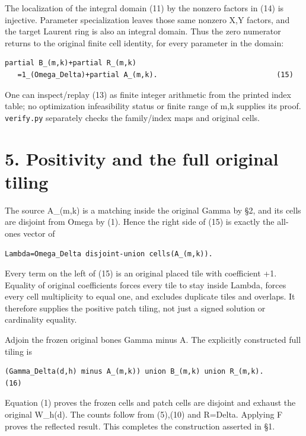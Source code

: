 \documentclass[
  10pt,
]{scrreprt}
\begin{document}
The localization of the integral domain (11) by the nonzero factors in
(14) is injective. Parameter specialization leaves those same nonzero
X,Y factors, and the target Laurent ring is also an integral domain.
Thus the zero numerator returns to the original finite cell identity,
for every parameter in the domain:

\begin{verbatim}
partial B_(m,k)+partial R_(m,k)
   =1_(Omega_Delta)+partial A_(m,k).                            (15)
\end{verbatim}

One can inspect/replay (13) as finite integer arithmetic from the
printed index table; no optimization infeasibility status or finite
range of m,k supplies its proof. \texttt{verify.py} separately checks
the family/index maps and original cells.

\section{5. Positivity and the full original
tiling}\label{edition-11-section-9}

The source A\_(m,k) is a matching inside the original Gamma by §2, and
its cells are disjoint from Omega by (1). Hence the right side of (15)
is exactly the all-ones vector of

\begin{verbatim}
Lambda=Omega_Delta disjoint-union cells(A_(m,k)).
\end{verbatim}

Every term on the left of (15) is an original placed tile with
coefficient +1. Equality of original coefficients forces every tile to
stay inside Lambda, forces every cell multiplicity to equal one, and
excludes duplicate tiles and overlaps. It therefore supplies the
positive patch tiling, not just a signed solution or cardinality
equality.

Adjoin the frozen original bones Gamma minus A. The explicitly
constructed full tiling is

\begin{verbatim}
(Gamma_Delta(d,h) minus A_(m,k)) union B_(m,k) union R_(m,k).       (16)
\end{verbatim}

Equation (1) proves the frozen cells and patch cells are disjoint and
exhaust the original W\_h(d). The counts follow from (5),(10) and
\textbar R\textbar=Delta. Applying F proves the reflected result. This
completes the construction asserted in §1.
\end{document}
